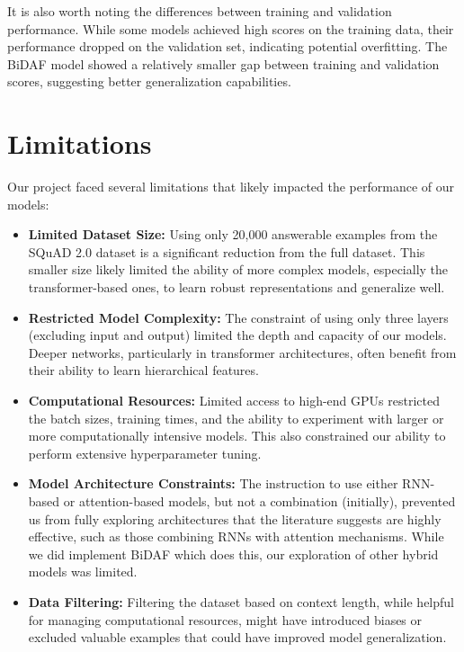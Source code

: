 \documentclass[runningheads]{llncs}
\begin{document}
It is also worth noting the differences between training and validation performance. While some models achieved high scores on the training data, their performance dropped on the validation set, indicating potential overfitting. The BiDAF model showed a relatively smaller gap between training and validation scores, suggesting better generalization capabilities.

\section{Limitations}

Our project faced several limitations that likely impacted the performance of our models:

\begin{itemize}
    \item \textbf{Limited Dataset Size:} Using only 20,000 answerable examples from the SQuAD 2.0 dataset is a significant reduction from the full dataset. This smaller size likely limited the ability of more complex models, especially the transformer-based ones, to learn robust representations and generalize well.
    
    \item \textbf{Restricted Model Complexity:} The constraint of using only three layers (excluding input and output) limited the depth and capacity of our models. Deeper networks, particularly in transformer architectures, often benefit from their ability to learn hierarchical features.
    
    \item \textbf{Computational Resources:} Limited access to high-end GPUs restricted the batch sizes, training times, and the ability to experiment with larger or more computationally intensive models. This also constrained our ability to perform extensive hyperparameter tuning.
    
    \item \textbf{Model Architecture Constraints:} The instruction to use either RNN-based or attention-based models, but not a combination (initially), prevented us from fully exploring architectures that the literature suggests are highly effective, such as those combining RNNs with attention mechanisms. While we did implement BiDAF which does this, our exploration of other hybrid models was limited.
    
    \item \textbf{Data Filtering:} Filtering the dataset based on context length, while helpful for managing computational resources, might have introduced biases or excluded valuable examples that could have improved model generalization.
    

\end{itemize}
\end{document}
